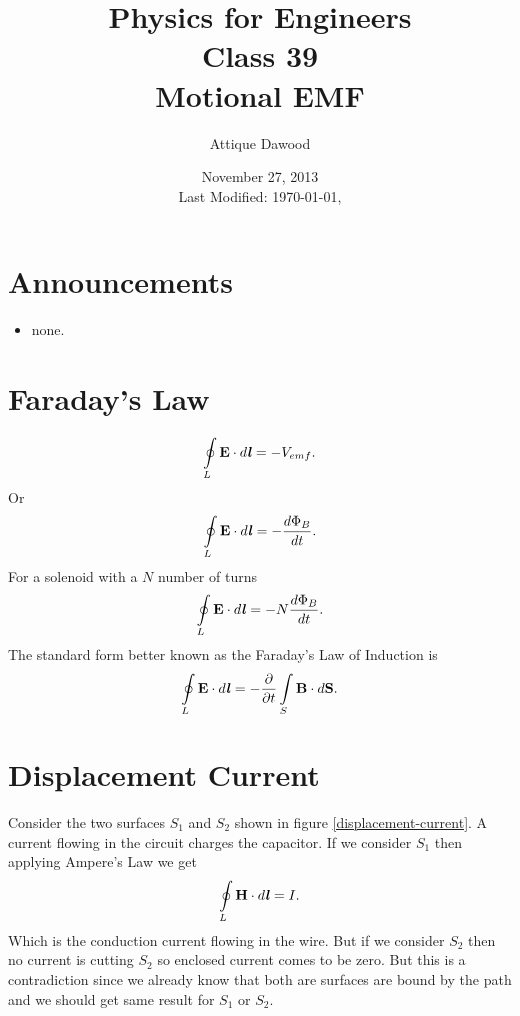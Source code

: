 \documentclass[12pt,a4paper]{article}
\title{\vspace{-3cm}Physics for Engineers\\Class 39\\Motional EMF}
\author{Attique Dawood}
\date{November 27, 2013\\[0.2cm] Last Modified: \today, \currenttime}
\begin{document}
\maketitle
\section{Announcements}
\begin{itemize}
\item none.
\end{itemize}
\section{Faraday's Law}
\begin{equation}
\oint\limits_{L} \textbf{E}\cdot d\textbf{\textit{l}}=-V_{emf}.
\end{equation}
Or
\begin{equation}
\oint\limits_{L} \textbf{E}\cdot d\textbf{\textit{l}}=-\dfrac{d\Phi_B}{dt}.
\end{equation}
For a solenoid with a $N$ number of turns
\begin{equation}
\oint\limits_{L} \textbf{E}\cdot d\textbf{\textit{l}}=-N\dfrac{d\Phi_B}{dt}.
\end{equation}
The standard form better known as the Faraday's Law of Induction is
\begin{equation}
\oint\limits_{L} \textbf{E}\cdot d\textbf{\textit{l}}=-\dfrac{\partial}{\partial t}\int\limits_{S}\textbf{B}\cdot d\textbf{S}.
\end{equation}
\section{Displacement Current}
Consider the two surfaces $S_1$ and $S_2$ shown in figure \ref{displacement-current}. A current flowing in the circuit charges the capacitor. If we consider $S_1$ then applying Ampere's Law we get
\begin{equation}
\oint\limits_{L} \textbf{H}\cdot d\textbf{\textit{l}}=I.
\end{equation}
Which is the conduction current flowing in the wire. But if we consider $S_2$ then no current is cutting $S_2$ so enclosed current comes to be zero. But this is a contradiction since we already know that both are surfaces are bound by the path and we should get same result for $S_1$ or $S_2$.
\end{document}
